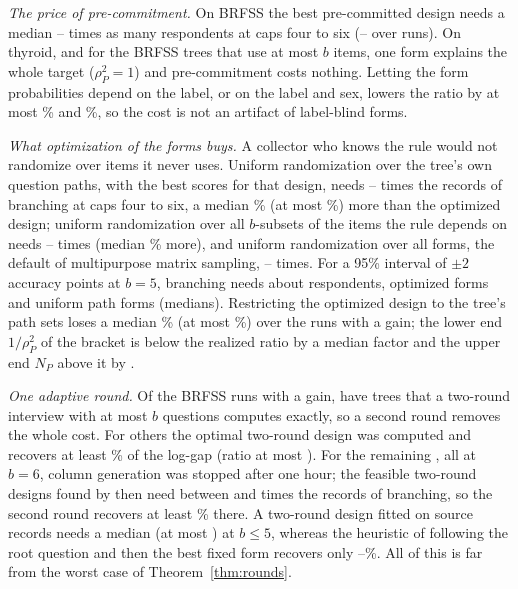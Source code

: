 \emph{The price of pre-commitment.} On BRFSS the best pre-committed design needs a median \nScreenBestLo--\nScreenBestHi{} times as many respondents at caps four to six (\nScreenRunLo--\nScreenRunHi{} over runs). On thyroid, and for the BRFSS trees that use at most $b$ items, one form explains the whole target ($\rho_P^2=1$) and pre-commitment costs nothing. Letting the form probabilities depend on the label, or on the label and sex, lowers the ratio by at most \nLabelMax\% and \nStratMax\%, so the cost is not an artifact of label-blind forms.

\emph{What optimization of the forms buys.} A collector who knows the rule would not randomize over items it never uses. Uniform randomization over the tree's own question paths, with the best scores for that design, needs \nUpsLo--\nUpsHi{} times the records of branching at caps four to six, a median \nUpsOverMed\% (at most \nUpsOverMax\%) more than the optimized design; uniform randomization over all $b$-subsets of the items the rule depends on needs \nUitLo--\nUitHi{} times (median \nUitOverMed\% more), and uniform randomization over all forms, the default of multipurpose matrix sampling, \nUnifLo--\nUnifHi{} times. For a 95\% interval of $\pm2$ accuracy points at $b=5$, branching needs about \nSsBranch{} respondents, optimized forms \nSsFixed{} and uniform path forms \nSsUps{} (medians). Restricting the optimized design to the tree's path sets loses a median \nPsGapMed\% (at most \nPsGapMax\%) over the \nPsGapN{} runs with a gain; the lower end $1/\rho_P^2$ of the bracket is below the realized ratio by a median factor \nLowUnder{} and the upper end $N_P$ above it by \nNpOver.

\emph{One adaptive round.} Of the \nScreenGainN{} BRFSS runs with a gain, \nGainComputable{} have trees that a two-round interview with at most $b$ questions computes exactly, so a second round removes the whole cost. For \nGainExactNon{} others the optimal two-round design was computed and recovers at least \nGainExactNonMin\% of the log-gap (ratio at most \nScreenTwoMax). For the remaining \nTwoBounded{}, all at $b=6$, column generation was stopped after one hour; the feasible two-round designs found by then need between \nTwoBoundMin{} and \nTwoBoundMax{} times the records of branching, so the second round recovers at least \nTwoBoundRec\% there. A two-round design fitted on source records needs a median \nScreenTwoFitMed{} (at most \nScreenTwoFitMax) at $b\le5$, whereas the heuristic of following the root question and then the best fixed form recovers only \nHeurLo--\nHeurHi\%. All of this is far from the worst case of Theorem~\ref{thm:rounds}.

